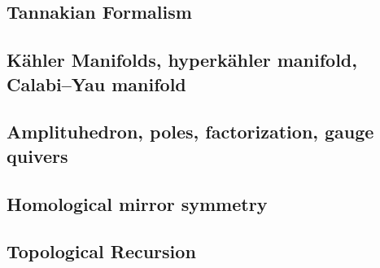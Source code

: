 \documentclass{article}
\theoremstyle{definition}
\begin{document}
    \subsection{Tannakian Formalism}
    \subsection{Kähler Manifolds, hyperkähler manifold, Calabi–Yau manifold}
    \subsection{Amplituhedron, poles, factorization, gauge quivers}
    \subsection{Homological mirror symmetry}
    \subsection{Topological Recursion}
    

\end{document}
